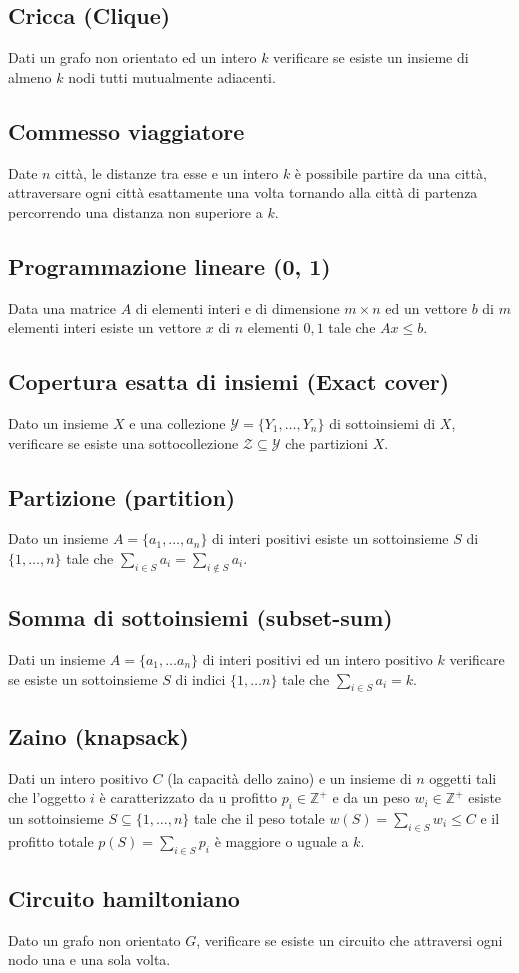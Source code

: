 \subsection{Cricca (Clique)}
Dati un grafo non orientato ed un intero $k$ verificare se esiste un insieme di almeno $k$ nodi tutti mutualmente adiacenti.
\subsection{Commesso viaggiatore}
Date $n$ citt\`a, le distanze tra esse e un intero $k$ \`e possibile partire da una citt\`a, attraversare ogni citt\`a esattamente una volta tornando alla citt\`a di partenza percorrendo
una distanza non superiore a $k$.
\subsection{Programmazione lineare (0, 1)}
Data una matrice $A$ di elementi interi e di dimensione $m\times n$ ed un vettore $b$ di $m$ elementi interi esiste un vettore $x$ di $n$ elementi $0, 1$ tale che $Ax\le b$.
\subsection{Copertura esatta di insiemi (Exact cover)}
Dato un insieme $X$ e una collezione $\mathcal{Y}=\{Y_1, \dots, Y_n\}$ di sottoinsiemi di $X$, verificare se esiste una sottocollezione $\mathcal{Z}\subseteq\mathcal{Y}$ che partizioni 
$X$.
\subsection{Partizione (partition)}
Dato un insieme $A=\{a_1, \dots, a_n\}$ di interi positivi esiste un sottoinsieme $S$ di $\{1, \dots,n\}$ tale che $\sum\limits_{i\in S}a_i = \sum\limits_{i\not\in S}a_i$.
\subsection{Somma di sottoinsiemi (subset-sum)}
Dati un insieme $A=\{a_1,\dots a_n\}$ di interi positivi ed un intero positivo $k$ verificare se esiste un sottoinsieme $S$ di indici $\{1, \dots n\}$ tale che 
$\sum\limits_{i\in S}a_i = k$.
\subsection{Zaino (knapsack)}
Dati un intero positivo $C$ (la capacit\`a dello zaino) e un insieme di $n$ oggetti tali che l'oggetto $i$ \`e caratterizzato da u profitto $p_i\in \mathbb{Z}^+$ e da un peso 
$w_i\in\mathbb{Z}^+$ esiste un sottoinsieme $S\subseteq\{1, \dots, n\}$ tale che il peso totale $w(S)=\sum\limits_{i\in S} w_i\le C$ e il profitto totale $p(S) = \sum\limits_{i\in S}p_i$
\`e maggiore o uguale a $k$.
\subsection{Circuito hamiltoniano}
Dato un grafo non orientato $G$, verificare se esiste un circuito che attraversi ogni nodo una e una sola volta.


